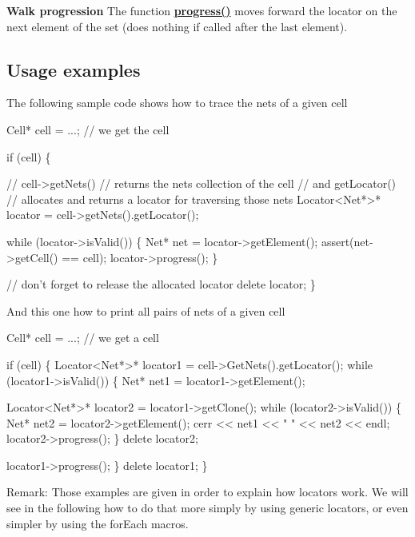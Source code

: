 {\bfseries Walk progression} The function {\bfseries \hyperlink{classHurricane_1_1Locator_ad8d72c1625a343a50520792c96fa1ca1}{progress()}} moves forward the locator on the next element of the set (does nothing if called after the last element).\hypertarget{classHurricane_1_1Locator_secLocatorUsageExamples}{}\subsection{Usage examples}\label{classHurricane_1_1Locator_secLocatorUsageExamples}
The following sample code shows how to trace the nets of a given cell 
\begin{DoxyCode}
Cell* cell = ...; \textcolor{comment}{// we get the cell}
 
\textcolor{keywordflow}{if} (cell) \{
 
   \textcolor{comment}{// cell->getNets()}
   \textcolor{comment}{//    returns the nets collection of the cell}
   \textcolor{comment}{// and getLocator()}
   \textcolor{comment}{//    allocates and returns a locator for traversing those nets}
   Locator<Net*>* locator = cell->getNets().getLocator();
 
   \textcolor{keywordflow}{while} (locator->isValid()) \{
      Net* net = locator->getElement();
      assert(net->getCell() == cell);
      locator->progress();
   \}
 
   \textcolor{comment}{// don't forget to release the allocated locator}
   \textcolor{keyword}{delete} locator;
\}
\end{DoxyCode}
 And this one how to print all pairs of nets of a given cell 
\begin{DoxyCode}
Cell* cell = ...; \textcolor{comment}{// we get a cell}
 
\textcolor{keywordflow}{if} (cell) \{
   Locator<Net*>* locator1 = cell->GetNets().getLocator();
   \textcolor{keywordflow}{while} (locator1->isValid()) \{
      Net* net1 = locator1->getElement();
 
      Locator<Net*>* locator2 = locator1->getClone();
      \textcolor{keywordflow}{while} (locator2->isValid()) \{
         Net* net2 = locator2->getElement();
         cerr << net1 << \textcolor{stringliteral}{" "} << net2 << endl;
         locator2->progress();
      \}
      \textcolor{keyword}{delete} locator2;
 
      locator1->progress();
   \}
   \textcolor{keyword}{delete} locator1;
\}
\end{DoxyCode}
 \begin{DoxyParagraph}{Remark\-:}
Those examples are given in order to explain how locators work. We will see in the following how to do that more simply by using generic locators, or even simpler by using the for\-Each macros. 
\end{DoxyParagraph}


